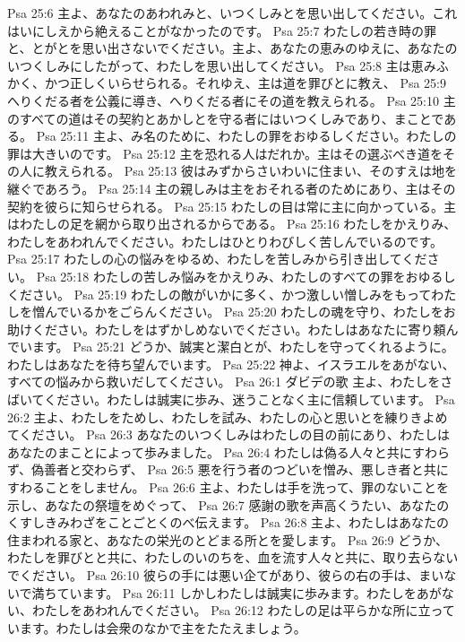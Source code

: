 Psa 25:6  主よ、あなたのあわれみと、いつくしみとを思い出してください。これはいにしえから絶えることがなかったのです。
Psa 25:7  わたしの若き時の罪と、とがとを思い出さないでください。主よ、あなたの恵みのゆえに、あなたのいつくしみにしたがって、わたしを思い出してください。
Psa 25:8  主は恵みふかく、かつ正しくいらせられる。それゆえ、主は道を罪びとに教え、
Psa 25:9  へりくだる者を公義に導き、へりくだる者にその道を教えられる。
Psa 25:10  主のすべての道はその契約とあかしとを守る者にはいつくしみであり、まことである。
Psa 25:11  主よ、み名のために、わたしの罪をおゆるしください。わたしの罪は大きいのです。
Psa 25:12  主を恐れる人はだれか。主はその選ぶべき道をその人に教えられる。
Psa 25:13  彼はみずからさいわいに住まい、そのすえは地を継ぐであろう。
Psa 25:14  主の親しみは主をおそれる者のためにあり、主はその契約を彼らに知らせられる。
Psa 25:15  わたしの目は常に主に向かっている。主はわたしの足を網から取り出されるからである。
Psa 25:16  わたしをかえりみ、わたしをあわれんでください。わたしはひとりわびしく苦しんでいるのです。
Psa 25:17  わたしの心の悩みをゆるめ、わたしを苦しみから引き出してください。
Psa 25:18  わたしの苦しみ悩みをかえりみ、わたしのすべての罪をおゆるしください。
Psa 25:19  わたしの敵がいかに多く、かつ激しい憎しみをもってわたしを憎んでいるかをごらんください。
Psa 25:20  わたしの魂を守り、わたしをお助けください。わたしをはずかしめないでください。わたしはあなたに寄り頼んでいます。
Psa 25:21  どうか、誠実と潔白とが、わたしを守ってくれるように。わたしはあなたを待ち望んでいます。
Psa 25:22  神よ、イスラエルをあがない、すべての悩みから救いだしてください。
Psa 26:1  ダビデの歌 主よ、わたしをさばいてください。わたしは誠実に歩み、迷うことなく主に信頼しています。
Psa 26:2  主よ、わたしをためし、わたしを試み、わたしの心と思いとを練りきよめてください。
Psa 26:3  あなたのいつくしみはわたしの目の前にあり、わたしはあなたのまことによって歩みました。
Psa 26:4  わたしは偽る人々と共にすわらず、偽善者と交わらず、
Psa 26:5  悪を行う者のつどいを憎み、悪しき者と共にすわることをしません。
Psa 26:6  主よ、わたしは手を洗って、罪のないことを示し、あなたの祭壇をめぐって、
Psa 26:7  感謝の歌を声高くうたい、あなたのくすしきみわざをことごとくのべ伝えます。
Psa 26:8  主よ、わたしはあなたの住まわれる家と、あなたの栄光のとどまる所とを愛します。
Psa 26:9  どうか、わたしを罪びとと共に、わたしのいのちを、血を流す人々と共に、取り去らないでください。
Psa 26:10  彼らの手には悪い企てがあり、彼らの右の手は、まいないで満ちています。
Psa 26:11  しかしわたしは誠実に歩みます。わたしをあがない、わたしをあわれんでください。
Psa 26:12  わたしの足は平らかな所に立っています。わたしは会衆のなかで主をたたえましょう。
